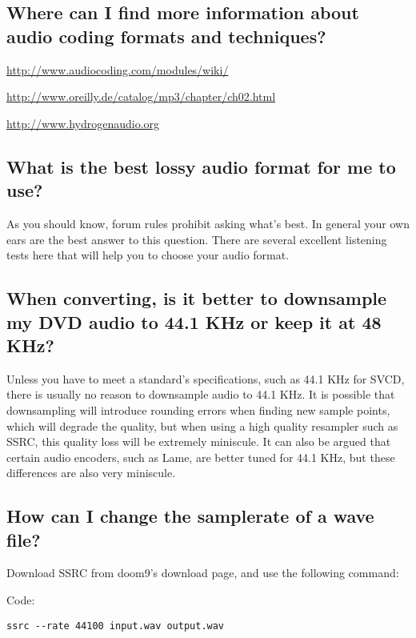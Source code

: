 ﻿\documentclass[12pt]{article}
\begin{document}
\subsection{Where can I find more information about audio coding formats and techniques?}

\hyperlink{http://www.audiocoding.com/modules/wiki/}{http://www.audiocoding.com/modules/wiki/}

\hyperlink{http://www.oreilly.de/catalog/mp3/chapter/ch02.html}{http://www.oreilly.de/catalog/mp3/chapter/ch02.html}

\hyperlink{http://www.hydrogenaudio.org}{http://www.hydrogenaudio.org}

\subsection{What is the best lossy audio format for me to use?}

As you should know, forum rules prohibit asking what's best. In general your own ears are the best
answer to this question. There are several excellent listening tests here that will help you to
choose your audio format.

\subsection{When converting, is it better to downsample my DVD audio to 44.1 KHz or keep it at 48 KHz?}

Unless you have to meet a standard's specifications, such as 44.1 KHz for SVCD, there is usually no
reason to downsample audio to 44.1 KHz. It is possible that downsampling will introduce rounding
errors when finding new sample points, which will degrade the quality, but when using a high quality
resampler such as SSRC, this quality loss will be extremely miniscule. It can also be argued that
certain audio encoders, such as Lame, are better tuned for 44.1 KHz, but these differences are also
very miniscule.

\subsection{How can I change the samplerate of a wave file?}

Download SSRC from doom9's download page, and use the following command:

Code:
\begin{lstlisting}
ssrc --rate 44100 input.wav output.wav
\end{lstlisting}
\end{document}
